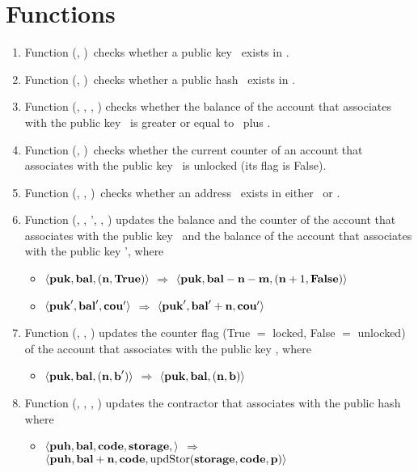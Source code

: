 \documentclass[a4paper]{llncs}
\begin{document}
\section{Functions}
\begin{enumerate}
    \item Function \CHECKPUB (\PUK, \MANAGERS)\ checks whether a public key \PUK\ exists in \MANAGERS.
    \item Function \CHECKPUH (\PUH, \CONTRACTORS)\ checks whether a public hash \PUH\ exists in \CONTRACTORS.
    \item Function \CHECKBAL (\MANAGERS, \PUK, \NTEZ, \MTEZ) checks whether the balance of the account that associates with the public key \PUK\ is greater or equal to \NTEZ\ plus \MTEZ.
    \item Function \CHECKCOU (\MANAGERS, \PUK)\ checks whether the current counter of an account that associates with the public key \PUK\ is unlocked (its flag is False).
    \item Function \CHECKEXIST (\ADDR, \PENDING, \ACCEPTED)\ checks whether an address  \ADDR\ exists in either \PENDING\ or \ACCEPTED.
    \item Function \UPDATESUCC(\MANAGERS, \PUK, \PUK', \NTEZ, \MTEZ) updates the balance and the counter of the account that associates with the public key \PUK\ and the balance of the account that associates with the public key \PUK', where
    \begin{itemize}
        \item[]  $\langle  \textbf{puk}, \textbf{bal}, (\textbf{n}, \textbf{True}) \rangle $ $\Rightarrow$ $\langle  \textbf{puk}, \textbf{bal} - \textbf{n} - \textbf{m}, (\textbf{n} + 1, \textbf{False}) \rangle $      
        \item[] $\langle  \textbf{puk}', \textbf{bal}', \textbf{cou}' \rangle$ $\Rightarrow$ $\langle  \textbf{puk}', \textbf{bal}' + \textbf{n}, \textbf{cou}' \rangle $         
    \end{itemize}
    
    \item Function \UPDATECOU(\MANAGERS, \PUK, \BOOLEAN) updates the counter flag (True $=$ locked, False $=$ unlocked) of the account that associates with the public key \PUK, where
    \begin{itemize}
        \item[]  $\langle  \textbf{puk}, \textbf{bal}, (\textbf{n}, \textbf{b}') \rangle $ $\Rightarrow$ $\langle  \textbf{puk}, \textbf{bal}, (\textbf{n}, \textbf{b}) \rangle $ 
    \end{itemize}
    
    \item Function  \UPDATECONSTR (\CONTRACTORS, \PUH, \NTEZ, \PARAMETER) updates the contractor that associates with the public hash \PUH\, where
    \begin{itemize}
        \item[] $\langle  \textbf{puh}, \textbf{bal}, \textbf{code}, \textbf{storage}, \rangle $ $\Rightarrow$ $\langle  \textbf{puh}, \textbf{bal} + \textbf{n}, \textbf{code}, \\ \textup{updStor}(\textbf{storage},\textbf{code},\textbf{p}) \rangle $
    \end{itemize}
    

\end{enumerate}
\end{document}
